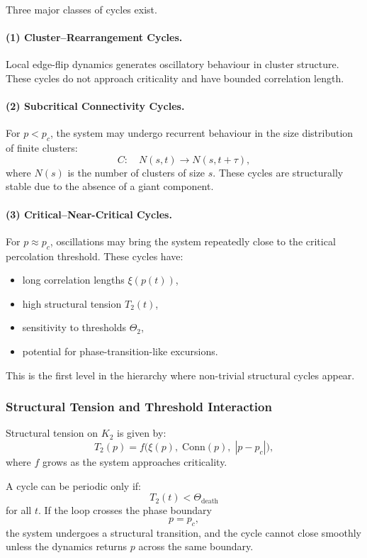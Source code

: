 Three major classes of cycles exist.

\paragraph{(1) Cluster–Rearrangement Cycles.}
Local edge-flip dynamics generates oscillatory behaviour in cluster
structure.
These cycles do not approach criticality and have bounded correlation
length.

\paragraph{(2) Subcritical Connectivity Cycles.}
For $p<p_c$, the system may undergo recurrent behaviour in the size
distribution of finite clusters:
\[
  C: \quad
  N(s,t) \to N(s,t+\tau),
\]
where $N(s)$ is the number of clusters of size $s$.
These cycles are structurally stable due to the absence of a giant
component.

\paragraph{(3) Critical–Near-Critical Cycles.}
For $p\approx p_c$, oscillations may bring the system repeatedly close
to the critical percolation threshold.
These cycles have:

\begin{itemize}
  \item long correlation lengths $\xi(p(t))$,
  \item high structural tension $T_2(t)$,
  \item sensitivity to thresholds $\Theta_2$,
  \item potential for phase-transition-like excursions.
\end{itemize}

This is the first level in the hierarchy where non-trivial structural
cycles appear.

\subsubsection{Structural Tension and Threshold Interaction}

Structural tension on $K_2$ is given by:
\[
  T_2(p)
  = f\bigl(\xi(p),\; \mathrm{Conn}(p),\;
       |p - p_c|\bigr),
\]
where $f$ grows as the system approaches criticality.

A cycle can be periodic only if:
\[
  T_2(t) < \Theta_{\mathrm{death}}
\]
for all $t$.
If the loop crosses the phase boundary
\[
  p = p_c,
\]
the system undergoes a structural transition, and the cycle cannot close
smoothly unless the dynamics returns $p$ across the same boundary.

